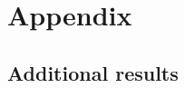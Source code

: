 \documentclass[aspectratio=169,xcolor=dvipsnames, 11pt,mathserif]{beamer}
\begin{document}

\appendix
\section{Appendix}

\subsection{Additional results}

\end{document}

